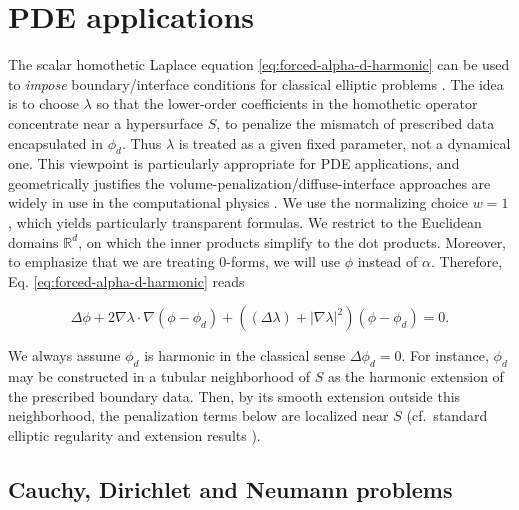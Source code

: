 \documentclass[preprint,12pt]{elsarticle}
\theoremstyle{plain}
\theoremstyle{definition}
\theoremstyle{note}
\newcommand{\R}{\mathbb{R}}
\newcommand{\grad}{\nabla}
\begin{document}
\section{PDE applications}\label{PDE-Appl}

The scalar homothetic Laplace equation \eqref{eq:forced-alpha-d-harmonic} can be used to \emph{impose} boundary/interface conditions for classical elliptic problems \cite{Evans2010,GilbargTrudinger2001}. The idea is to choose $\lambda$ so that the lower-order coefficients in the homothetic operator concentrate near a hypersurface $S$, to penalize the mismatch of prescribed data encapsulated in $\phi_d$. Thus $\lambda$ is treated as a given fixed parameter, not a dynamical one. This viewpoint is particularly appropriate for PDE applications, and geometrically justifies the volume-penalization/diffuse-interface approaches are widely in use in the computational physics \cite{AngotBruneauFabrie1999,Mittal2008,Nguyen2014}. We use the normalizing choice $w=1$, which yields particularly transparent formulas. We restrict to the Euclidean domains $\R^d$, on which the inner products simplify to the dot products. Moreover, to emphasize that we are treating 0-forms, we will use $\phi$ instead of $\alpha$. Therefore, Eq. \eqref{eq:forced-alpha-d-harmonic} reads 

\begin{equation}\label{eq:forced-alpha-d-harmonic-Euc}
\Delta \phi + 2\grad\lambda\cdot\grad (\phi-\phi_d)+ \left( (\Delta\lambda) + |\grad\lambda|^2 \right)(\phi-\phi_d) = 0.
\end{equation}

We always assume $\phi_d$ is harmonic in the classical sense $\Delta \phi_d=0$. For instance, $\phi_d$ may be constructed in a tubular neighborhood of $S$ as the harmonic extension of the prescribed boundary data. Then, by its smooth extension outside this neighborhood, the penalization terms below are localized near $S$ (cf.\ standard elliptic regularity and extension results \cite{GilbargTrudinger2001,Evans2010}).

\subsection{Cauchy, Dirichlet and Neumann problems}\label{subsec:7.1}
\end{document}
